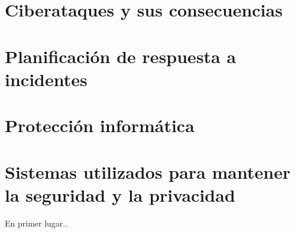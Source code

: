 \section{Ciberataques y sus consecuencias}
\label{sec:ciberataques-y-consecuencias}


\section{Planificación de respuesta a incidentes}
\label{sec:planificacion-de-respuesta}


\section{Protección informática}
\label{sec:proteccion-informatica}


\section{Sistemas utilizados para mantener la seguridad y la privacidad}
\label{sec: tipos-sistemas}

En primer lugar.\cite{rstudio}.










